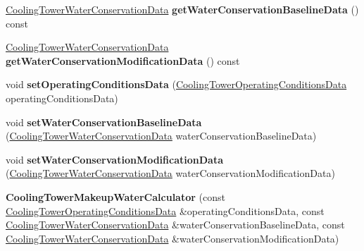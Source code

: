 \begin{DoxyCompactItemize}
\hyperlink{class_cooling_tower_water_conservation_data}{Cooling\+Tower\+Water\+Conservation\+Data} {\bfseries get\+Water\+Conservation\+Baseline\+Data} () const
\item 
\mbox{\label{class_cooling_tower_makeup_water_calculator_a4803b3f8e0ea3aa6ef31f686a48b35e7}} 
\hyperlink{class_cooling_tower_water_conservation_data}{Cooling\+Tower\+Water\+Conservation\+Data} {\bfseries get\+Water\+Conservation\+Modification\+Data} () const
\item 
\mbox{\label{class_cooling_tower_makeup_water_calculator_ab854c22dff3139c644399cfb34aba693}} 
void {\bfseries set\+Operating\+Conditions\+Data} (\hyperlink{class_cooling_tower_operating_conditions_data}{Cooling\+Tower\+Operating\+Conditions\+Data} operating\+Conditions\+Data)
\item 
\mbox{\label{class_cooling_tower_makeup_water_calculator_aad6f9b1a892dd62a95840dc18e1be48a}} 
void {\bfseries set\+Water\+Conservation\+Baseline\+Data} (\hyperlink{class_cooling_tower_water_conservation_data}{Cooling\+Tower\+Water\+Conservation\+Data} water\+Conservation\+Baseline\+Data)
\item 
\mbox{\label{class_cooling_tower_makeup_water_calculator_a3197dc0cd103c582e4b00fdf5790583a}} 
void {\bfseries set\+Water\+Conservation\+Modification\+Data} (\hyperlink{class_cooling_tower_water_conservation_data}{Cooling\+Tower\+Water\+Conservation\+Data} water\+Conservation\+Modification\+Data)
\item 
\mbox{\label{class_cooling_tower_makeup_water_calculator_a5b2e764931ef302ba3bd8bbde7775187}} 
{\bfseries Cooling\+Tower\+Makeup\+Water\+Calculator} (const \hyperlink{class_cooling_tower_operating_conditions_data}{Cooling\+Tower\+Operating\+Conditions\+Data} \&operating\+Conditions\+Data, const \hyperlink{class_cooling_tower_water_conservation_data}{Cooling\+Tower\+Water\+Conservation\+Data} \&water\+Conservation\+Baseline\+Data, const \hyperlink{class_cooling_tower_water_conservation_data}{Cooling\+Tower\+Water\+Conservation\+Data} \&water\+Conservation\+Modification\+Data)
\item 

\end{DoxyCompactItemize}

